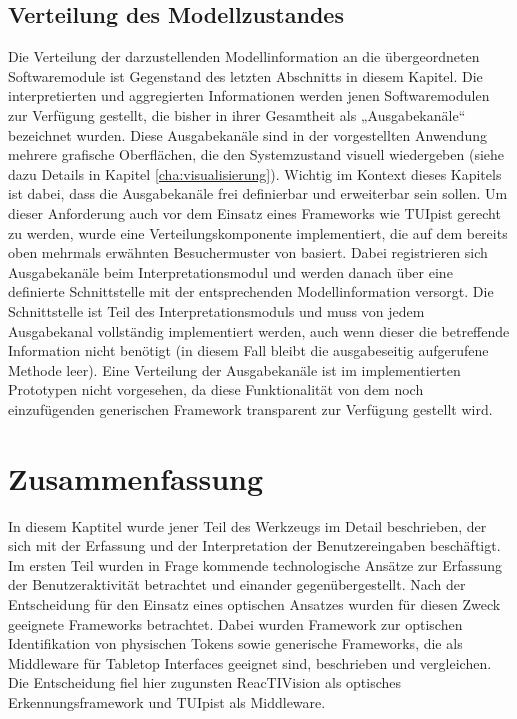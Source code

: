 
\subsection{Verteilung des Modellzustandes} %
\label{sub:verteilung_des_modellzustandes}

Die Verteilung der darzustellenden Modellinformation an die übergeordneten Softwaremodule ist Gegenstand des letzten Abschnitts in diesem Kapitel. Die interpretierten und aggregierten Informationen werden jenen Softwaremodulen zur Verfügung gestellt, die bisher in ihrer Gesamtheit als „Ausgabekanäle“ bezeichnet wurden. Diese Ausgabekanäle sind in der vorgestellten Anwendung mehrere grafische Oberflächen, die den Systemzustand visuell wiedergeben (siehe dazu Details in Kapitel \ref{cha:visualisierung}). Wichtig im Kontext dieses Kapitels ist dabei, dass die Ausgabekanäle frei definierbar und erweiterbar sein sollen. Um dieser Anforderung auch vor dem Einsatz eines Frameworks wie TUIpist gerecht zu werden, wurde eine Verteilungskomponente implementiert, die auf dem bereits oben mehrmals erwähnten Besuchermuster von \citet{Gamma95} basiert. Dabei registrieren sich Ausgabekanäle beim Interpretationsmodul und werden danach über eine definierte Schnittstelle mit der entsprechenden Modellinformation versorgt. Die Schnittstelle ist Teil des Interpretationsmoduls und muss von jedem Ausgabekanal vollständig implementiert werden, auch wenn dieser die betreffende Information nicht benötigt (in diesem Fall bleibt die ausgabeseitig aufgerufene Methode leer). Eine Verteilung der Ausgabekanäle ist im implementierten Prototypen nicht vorgesehen, da diese Funktionalität von dem noch einzufügenden generischen Framework transparent zur Verfügung gestellt wird. 


\section{Zusammenfassung} %
\label{sec:input_zusammenfassung}

In diesem Kaptitel wurde jener Teil des Werkzeugs im Detail beschrieben, der sich mit der Erfassung und der Interpretation der Benutzereingaben beschäftigt. Im ersten Teil wurden in Frage kommende technologische Ansätze zur Erfassung der Benutzeraktivität betrachtet und einander gegenübergestellt. Nach der Entscheidung für den Einsatz eines optischen Ansatzes wurden für diesen Zweck geeignete Frameworks betrachtet. Dabei wurden Framework zur optischen Identifikation von physischen Tokens sowie generische Frameworks, die als Middleware für Tabletop Interfaces geeignet sind, beschrieben und vergleichen. Die Entscheidung fiel hier zugunsten ReacTIVision \citep{Kaltenbrunner07} als optisches Erkennungsframework und TUIpist \citep{Furtmuller07a} als Middleware.


